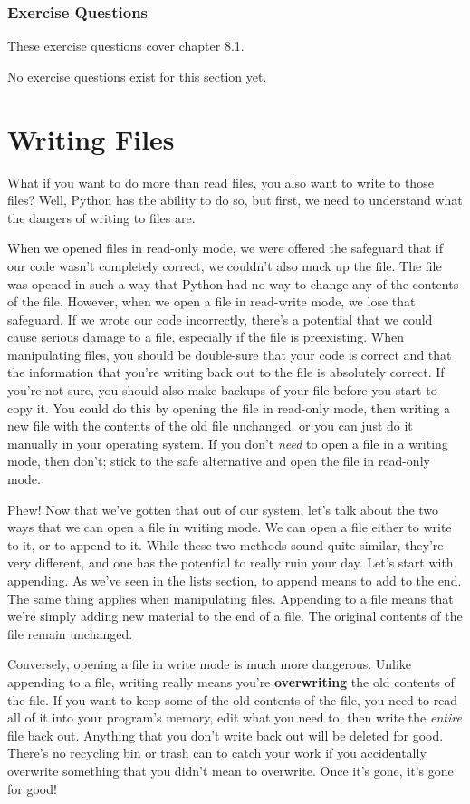 \subsubsection*{Exercise Questions}
These exercise questions cover chapter 8.1.

No exercise questions exist for this section yet.
\section{Writing Files}
What if you want to do more than read files, you also want to write to those files? Well, Python has the ability to do so, but first, we need to understand what the dangers of writing to files are.\par
When we opened files in read-only mode, we were offered the safeguard that if our code wasn't completely correct, we couldn't also muck up the file. The file was opened in such a way that Python had no way to change any of the contents of the file. However, when we open a file in read-write mode, we lose that safeguard. If we wrote our code incorrectly, there's a potential that we could cause serious damage to a file, especially if the file is preexisting. When manipulating files, you should be double-sure that your code is correct and that the information that you're writing back out to the file is absolutely correct. If you're not sure, you should also make backups of your file before you start to copy it. You could do this by opening the file in read-only mode, then writing a new file with the contents of the old file unchanged, or you can just do it manually in your operating system. If you don't \textit{need} to open a file in a writing mode, then don't; stick to the safe alternative and open the file in read-only mode.\par
Phew! Now that we've gotten that out of our system, let's talk about the two ways that we can open a file in writing mode. We can open a file either to write to it, or to append to it. While these two methods sound quite similar, they're very different, and one has the potential to really ruin your day. Let's start with appending. As we've seen in the lists section, to append means to add to the end. The same thing applies when manipulating files. Appending to a file means that we're simply adding new material to the end of a file. The original contents of the file remain unchanged.\par
Conversely, opening a file in write mode is much more dangerous. Unlike appending to a file, writing really means you're \textbf{overwriting} the old contents of the file. If you want to keep some of the old contents of the file, you need to read all of it into your program's memory, edit what you need to, then write the \textit{entire} file back out. Anything that you don't write back out will be deleted for good. There's no recycling bin or trash can to catch your work if you accidentally overwrite something that you didn't mean to overwrite. Once it's gone, it's gone for good!\par
